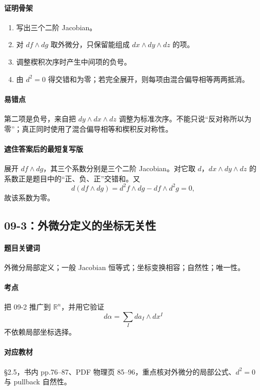\documentclass[12pt,a4paper]{ctexart}
\newcommand{\R}{\mathbb R}
\begin{document}
\paragraph{证明骨架}
\begin{enumerate}
  \item 写出三个二阶 Jacobian。
  \item 对 $df\wedge dg$ 取外微分，只保留能组成 $dx\wedge dy\wedge dz$ 的项。
  \item 调整楔积次序时产生中间项的负号。
  \item 由 $d^2=0$ 得交错和为零；若完全展开，则每项由混合偏导相等两两抵消。
\end{enumerate}

\paragraph{易错点}
第二项是负号，来自把 $dy\wedge dx\wedge dz$ 调整为标准次序。不能只说“反对称所以为零”；真正同时使用了混合偏导相等和楔积反对称性。

\paragraph{遮住答案后的最短复写版}
展开 $df\wedge dg$，其三个系数分别是三个二阶 Jacobian。对它取 $d$，$dx\wedge dy\wedge dz$ 的系数正是题目中的“正、负、正”交错和。又
\[
  d(df\wedge dg)=d^2f\wedge dg-df\wedge d^2g=0,
\]
故该系数为零。

\subsection{09-3：外微分定义的坐标无关性}

\paragraph{题目关键词}
外微分局部定义；一般 Jacobian 恒等式；坐标变换相容；自然性；唯一性。

\paragraph{考点}
把 09-2 推广到 $\R^n$，并用它验证
\[
  d\alpha=\sum_I da_I\wedge dx^I
\]
不依赖局部坐标选择。

\paragraph{对应教材}
\S 2.5，书内 pp.76--87、PDF 物理页 85--96，重点核对外微分的局部公式、$d^2=0$ 与 pullback 自然性。
\end{document}
